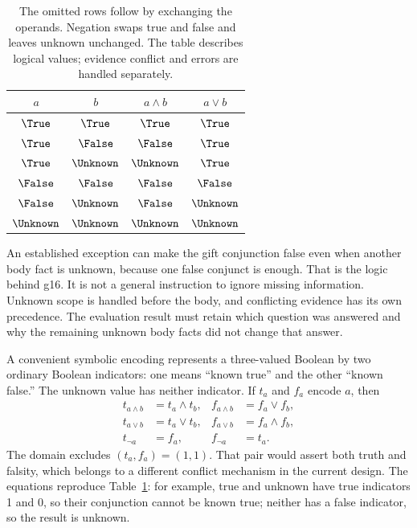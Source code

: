 \begin{table}[H]
\centering
\begin{tabular}{cc|cc}
\toprule
$a$ & $b$ & $a\land b$ & $a\lor b$\\
\midrule
$\True$ & $\True$ & $\True$ & $\True$\\
$\True$ & $\False$ & $\False$ & $\True$\\
$\True$ & $\Unknown$ & $\Unknown$ & $\True$\\
$\False$ & $\False$ & $\False$ & $\False$\\
$\False$ & $\Unknown$ & $\False$ & $\Unknown$\\
$\Unknown$ & $\Unknown$ & $\Unknown$ & $\Unknown$\\
\bottomrule
\end{tabular}
\caption{The omitted rows follow by exchanging the operands. Negation swaps
true and false and leaves unknown unchanged. The table describes logical values;
evidence conflict and errors are handled separately.}
\label{tab:kleene}
\end{table}

An established exception can make the gift conjunction false even when another
body fact is unknown, because one false conjunct is enough. That is the logic
behind g16. It is not a general instruction to ignore missing information.
Unknown scope is handled before the body, and conflicting evidence has its own
precedence. The evaluation result must retain which question was answered and
why the remaining unknown body facts did not change that answer.


A convenient symbolic encoding represents a three-valued Boolean by two ordinary
Boolean indicators: one means ``known true'' and the other ``known false.'' The
unknown value has neither indicator. If $t_a$ and $f_a$ encode $a$, then
\begin{align}
 t_{a\land b}&=t_a\land t_b,& f_{a\land b}&=f_a\lor f_b,\label{eq:kleene-and}\\
 t_{a\lor b}&=t_a\lor t_b,& f_{a\lor b}&=f_a\land f_b,\label{eq:kleene-or}\\
 t_{\neg a}&=f_a,& f_{\neg a}&=t_a.\label{eq:kleene-not}
\end{align}
The domain excludes $(t_a,f_a)=(1,1)$. That pair would assert both truth and
falsity, which belongs to a different conflict mechanism in the current design.
The equations reproduce Table~\ref{tab:kleene}: for example, true and unknown
have true indicators 1 and 0, so their conjunction cannot be known true; neither
has a false indicator, so the result is unknown.

